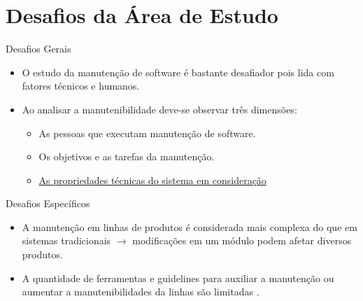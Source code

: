 \section{Desafios da Área de Estudo}
\begin{frame}[t, fragile]{Desafios Gerais}
    \begin{itemize}
      \item O estudo da manutenção de software é bastante \alert{desafiador} pois lida com fatores  técnicos e humanos.
      
      
      \item Ao analisar a manutenibilidade deve-se observar três dimensões\cite{Hanafi2015}:
      \begin{itemize}
	     \item As \alert{pessoas} que executam manutenção de software.
	     \item Os \alert{objetivos} e as \alert{tarefas} da manutenção.
	     \item \underline{As \alert{propriedades} técnicas do sistema em consideração}
      \end{itemize}
      
    \end{itemize}
\end{frame}

\begin{frame}[t, fragile]{Desafios Específicos}
    \begin{itemize}
      \item A \alert{manutenção} em linhas de produtos é considerada mais \alert{complexa} do que em \alert{sistemas tradicionais} $\rightarrow$ \alert{modificações} em um módulo podem afetar \alert{diversos produtos}.
      \item A \alert{quantidade} de ferramentas e guidelines para auxiliar a manutenção ou aumentar a manutenibilidades da linhas são \alert{limitadas}  \cite {Vale2015}.
      
    \end{itemize}
\end{frame}
